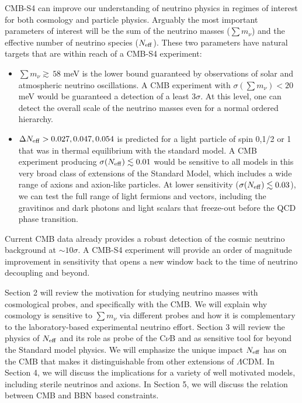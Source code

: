 CMB-S4 can improve our understanding of neutrino physics in regimes of interest for both cosmology and particle physics.  Arguably the most important parameters of interest will be the sum of the neutrino masses ($\sum m_\nu$) and the effective number of neutrino species ($N_{\rm eff}$).  These two parameters have natural targets that are within reach of a CMB-S4 experiment:
\begin{itemize}
\item $ \sum m_\nu \gtrsim \, 58$ meV is the lower bound guaranteed by observations of solar and atmospheric neutrino oscillations.  A CMB experiment with $\sigma(\sum m_\nu) < 20$ meV would be guaranteed a detection of a least 3$\sigma$.  At this level, one can detect the overall scale of the neutrino masses even for a normal ordered hierarchy.
\item $\Delta N_{\rm eff} >  0.027, 0.047, 0.054$ is predicted for a light particle of spin 0,1/2 or 1 that was in thermal equilibrium with the standard model.  A CMB experiment producing $\sigma(N_{\rm eff}) \lesssim 0.01$ would be sensitive to all models in this very broad class of extensions of the Standard Model, which includes a wide range of axions and axion-like particles.  At lower sensitivity ($\sigma(N_{\rm eff}) \lesssim 0.03$), we can test the full range of light fermions and vectors, including the gravitinos and dark photons and light scalars that freeze-out before the QCD phase transition.  
\end{itemize}
Current CMB data already provides a robust detection of the cosmic neutrino background at $\sim10 \sigma$.  A CMB-S4 experiment will provide an order of magnitude improvement in sensitivity that opens a new window back to the time of neutrino decoupling and beyond.

Section 2 will review the motivation for studying neutrino masses with cosmological probes, and specifically with the CMB.  We will explain why cosmology is sensitive to $\sum m_\nu$ via different probes and how it is complementary to the laboratory-based experimental neutrino effort.  Section 3 will review the physics of $N_{\rm eff}$ and its role as probe of the C$\nu$B and as sensitive tool for beyond the Standard model physics.  We will emphasize the unique impact $N_{\rm eff}$ has on the CMB that makes it distinguishable from other extensions of $\Lambda$CDM.  In Section 4, we will discuss the implications for a variety of well motivated models, including sterile neutrinos and axions.  In Section 5, we will discuss the relation between CMB and BBN based constraints.  

